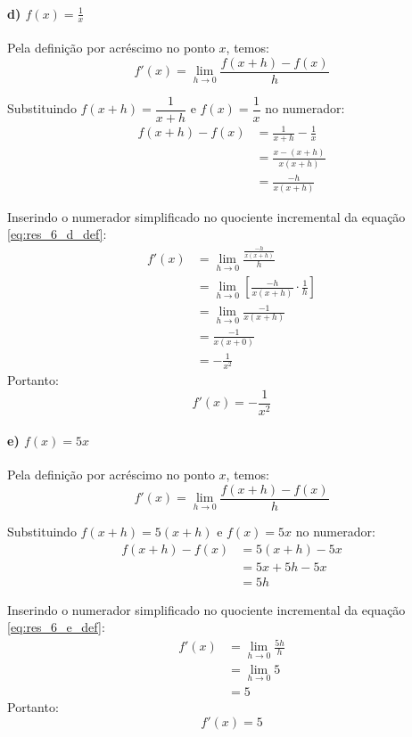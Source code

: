 \setcounter{equation}{0}
\paragraph{d) $f(x) = \frac{1}{x}$}

Pela definição por acréscimo no ponto $x$, temos:
\begin{equation}
f'(x) = \lim_{h \to 0} \frac{f(x + h) - f(x)}{h} \label{eq:res_6_d_def}
\end{equation}

Substituindo $f(x + h) = \dfrac{1}{x + h}$ e $f(x) = \dfrac{1}{x}$ no numerador:
\begin{align*}
f(x + h) - f(x) &= \frac{1}{x + h} - \frac{1}{x} \\
&= \frac{x - (x + h)}{x(x + h)} \\
&= \frac{-h}{x(x + h)}
\end{align*}

Inserindo o numerador simplificado no quociente incremental da equação \eqref{eq:res_6_d_def}:
\begin{align*}
f'(x) &= \lim_{h \to 0} \frac{\frac{-h}{x(x + h)}}{h} \\
      &= \lim_{h \to 0} \left[ \frac{-h}{x(x + h)} \cdot \frac{1}{h} \right] \\
      &= \lim_{h \to 0} \frac{-1}{x(x + h)} \\
      &= \frac{-1}{x(x + 0)} \\
      &= -\frac{1}{x^2}
\end{align*}
Portanto:
\[
  f'(x) = -\frac{1}{x^2}
\]

\setcounter{equation}{0}
\paragraph{e) $f(x) = 5x$}

Pela definição por acréscimo no ponto $x$, temos:
\begin{equation}
f'(x) = \lim_{h \to 0} \frac{f(x + h) - f(x)}{h} \label{eq:res_6_e_def}
\end{equation}

Substituindo $f(x + h) = 5(x + h)$ e $f(x) = 5x$ no numerador:
\begin{align*}
f(x + h) - f(x) &= 5(x + h) - 5x \\
&= 5x + 5h - 5x \\
&= 5h
\end{align*}

Inserindo o numerador simplificado no quociente incremental da equação \eqref{eq:res_6_e_def}:
\begin{align*}
f'(x) &= \lim_{h \to 0} \frac{5h}{h} \\
      &= \lim_{h \to 0} 5 \\
      &= 5
\end{align*}
Portanto:
\[
  f'(x) = 5
\]

